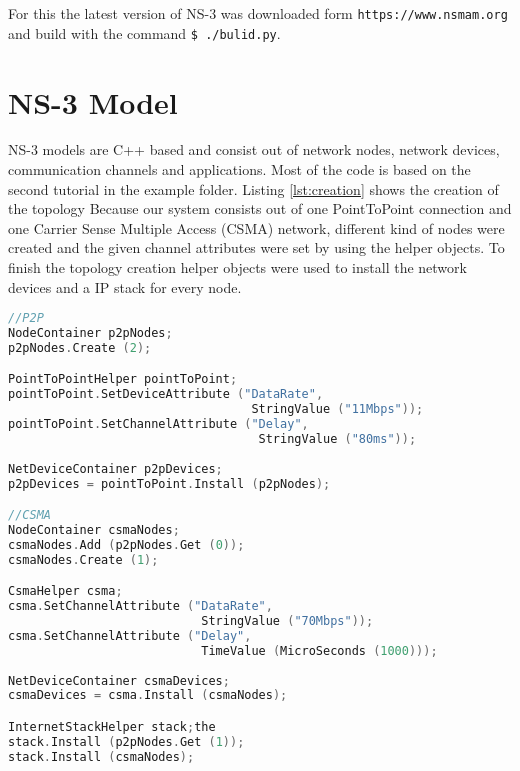 \documentclass[parskip=full]{scrartcl}
\begin{document}
For this the latest version of NS-3 was downloaded form \verb|https://www.nsmam.org| and build with the command \verb|$ ./bulid.py|. 


\section{NS-3 Model} \label{sec:procedure}
NS-3 models are C++ based and consist out of network nodes, network devices, communication channels and applications.
Most of the code is based on the second tutorial in the example folder.
Listing \ref{lst:creation} shows the creation of the topology
Because our system consists out of one PointToPoint connection and one Carrier Sense Multiple Access (CSMA) network, different kind of nodes were created and the given channel attributes were set by using the helper objects.
To finish the topology creation helper objects were used to install the network devices and a IP stack for every node.

\begin{lstlisting}[language=c++, frame=single, captionpos=b, caption={Topology creation}, label=lst:creation]
//P2P
NodeContainer p2pNodes;
p2pNodes.Create (2);

PointToPointHelper pointToPoint;
pointToPoint.SetDeviceAttribute ("DataRate", 
                                  StringValue ("11Mbps"));
pointToPoint.SetChannelAttribute ("Delay", 
                                   StringValue ("80ms"));
                                   
NetDeviceContainer p2pDevices;
p2pDevices = pointToPoint.Install (p2pNodes);

//CSMA
NodeContainer csmaNodes;
csmaNodes.Add (p2pNodes.Get (0));
csmaNodes.Create (1);

CsmaHelper csma;
csma.SetChannelAttribute ("DataRate", 
                           StringValue ("70Mbps"));
csma.SetChannelAttribute ("Delay", 
                           TimeValue (MicroSeconds (1000)));
                           
NetDeviceContainer csmaDevices;
csmaDevices = csma.Install (csmaNodes);

InternetStackHelper stack;the
stack.Install (p2pNodes.Get (1));
stack.Install (csmaNodes);
\end{lstlisting}
\end{document}
